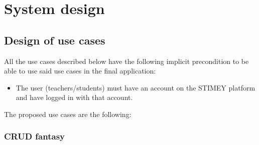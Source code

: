 \chapter{System design}
\section{Design of use cases}
All the use cases described below have the following implicit precondition to be able to use said use cases in the final application:
\begin{itemize}
	\item The user (teachers/students) must have an account on the STIMEY platform and have logged in with that account.
\end{itemize}

The proposed use cases are the following:

\subsection{CRUD fantasy}
\hypertarget{crearfantasia}{}
